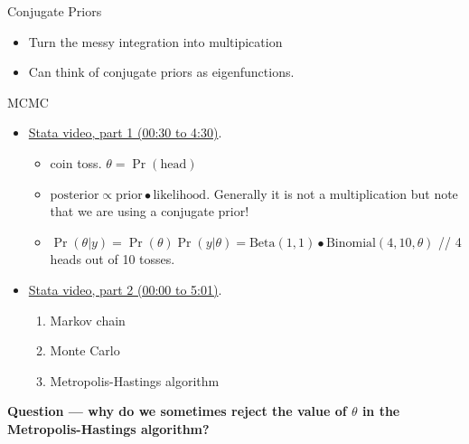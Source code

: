 \documentclass[20pt]{beamer}
\begin{document}
\begin{frame}{Conjugate Priors}
\begin{itemize}
  \item Turn the messy integration into multipication
  \item Can think of conjugate priors as eigenfunctions.
\end{itemize}
\end{frame}


\begin{frame}{MCMC}
\begin{itemize}
\item \href{https://www.youtube.com/watch?v=0F0QoMCSKJ4}{Stata video, part 1 (00:30 to 4:30)}.
  \begin{itemize}
    \item coin toss. $\theta = \Pr(\text{head})$
    \item $\text{posterior} \propto \text{prior} \bullet \text{likelihood}$. Generally it is not a multiplication but note that we are using a conjugate prior!
    \item $\Pr(\theta | y) = \Pr(\theta) \Pr(y | \theta)
= \text{Beta}(1, 1) \bullet \text{Binomial}(4, 10, \theta)$ // 4 heads out of 10 tosses.
  \end{itemize}



\item \href{https://www.youtube.com/watch?v=OTO1DygELpY}{Stata video, part 2 (00:00 to 5:01)}.
  \begin{enumerate}
    \item Markov chain
    \item Monte Carlo
    \item Metropolis-Hastings algorithm
  \end{enumerate}
\end{itemize}

\textbf{Question --- why do we sometimes reject the value of $\theta$ in the Metropolis-Hastings algorithm?}
\end{frame}
\end{document}
